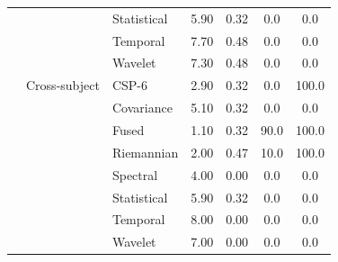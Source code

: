 \begin{table}[t]
\begin{tabular}{lllcccc}
 &  & Statistical & 5.90 & 0.32 & 0.0 & 0.0 \\
 &  & Temporal & 7.70 & 0.48 & 0.0 & 0.0 \\
 &  & Wavelet & 7.30 & 0.48 & 0.0 & 0.0 \\
\addlinespace[3pt]
 & Cross-subject & CSP-6 & 2.90 & 0.32 & 0.0 & 100.0 \\
 &  & Covariance & 5.10 & 0.32 & 0.0 & 0.0 \\
 &  & Fused & 1.10 & 0.32 & 90.0 & 100.0 \\
 &  & Riemannian & 2.00 & 0.47 & 10.0 & 100.0 \\
 &  & Spectral & 4.00 & 0.00 & 0.0 & 0.0 \\
 &  & Statistical & 5.90 & 0.32 & 0.0 & 0.0 \\
 &  & Temporal & 8.00 & 0.00 & 0.0 & 0.0 \\
 &  & Wavelet & 7.00 & 0.00 & 0.0 & 0.0 \\
\bottomrule
\end{tabular}
\end{table}
